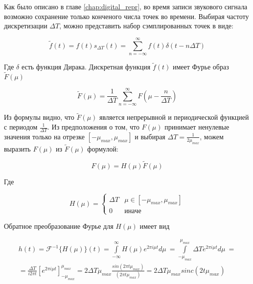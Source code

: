 \documentclass[oneside,final,14pt]{extreport}
\begin{document}
Как было описано в главе \ref{chap:digital_repr}, во время записи звукового сигнала возможно сохранение только конченого числа точек во времени. Выбирая частоту дискретизации $\Delta T$, можно представить набор сэмплированных точек в виде:

$$
\begin{equation}
\tilde{f}(t) = 
f(t)s_{\varDelta T}(t)
=
\sum_{n = -\infty}^{\infty}
f(t)
\delta(t - n\varDelta T)
\end{equation}
$$

Где $\delta$ есть функция Дирака. Дискретная функция  $\tilde{f}(t)$ имеет Фурье образ $\tilde{F}(\mu)$

$$
\begin{equation}
\tilde{F}(\mu) = 
\frac{1}{\varDelta T}
\sum_{n = - \infty}^{\infty}
F(
\mu - \frac{n}{\varDelta T}
)
\label{Furier_sampling_result}
\end{equation}
$$

Из формулы видно, что $\tilde{F}(\mu)$ является непрерывной и периодической функцией с периодом $\frac{1}{\Delta T}$.
Из предположения о том, что ${F}(\mu)$ принимает ненулевые значения только на отрезке $[-\mu_{max}, \mu_{max}]$  и выбирая $\varDelta T = \frac{1}{2\mu_{max}}$, можем выразить  ${F}(\mu)$ из  $\tilde{F}(\mu)$ формулой:

$$
\begin{equation}
F(\mu)
=
H(\mu)
\tilde{F}(\mu)
\end{equation}
$$

Где 

$$
\begin{equation}
H(\mu)
=
\begin{cases}
\varDelta T & 
\mu \in [-\mu_{max},\mu_{max}] \\
0 & иначе
\end{cases}
\end{equation}
$$

Обратное преобразование Фурье для $H(\mu)$ имеет вид

\begin{gather*}
h(t)
=
\mathcal{F}^{-1}\{H(\mu)\}(t)
=
\int\limits_{-\infty}^{\infty}
H(\mu)
e^{2\pi i \mu t }
d\mu~
=
\int\limits_{-\mu_{max}}^{\mu_{max}}
\varDelta T
e^{2\pi i \mu t }
d\mu~
=
\\
=
\frac{\varDelta T}
{i 2 \pi t} 
\left[
e^{	2\pi i \mu t }
\right]_{-\mu_{max}}^{\mu_{max}}
=
2\varDelta T \mu_{max}
\frac{sin(2\pi t \mu_{max}) }{(2\pi t \mu_{max})}
=
2\varDelta T \mu_{max}
sinc(2t\mu_{max})
\end{gather*}
\end{document}
